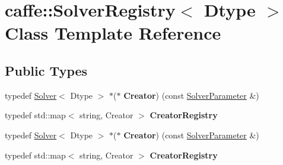 \hypertarget{classcaffe_1_1_solver_registry}{}\section{caffe\+:\+:Solver\+Registry$<$ Dtype $>$ Class Template Reference}
\label{classcaffe_1_1_solver_registry}
\subsection*{Public Types}
\begin{DoxyCompactItemize}
\item 
\mbox{\label{classcaffe_1_1_solver_registry_a27f13add21a1278d9a41b97b1c03ce1b}} 
typedef \mbox{\hyperlink{classcaffe_1_1_solver}{Solver}}$<$ Dtype $>$ $\ast$($\ast$ {\bfseries Creator}) (const \mbox{\hyperlink{classcaffe_1_1_solver_parameter}{Solver\+Parameter}} \&)
\item 
\mbox{\label{classcaffe_1_1_solver_registry_acbb92bec38689921e8c76feb85114733}} 
typedef std\+::map$<$ string, Creator $>$ {\bfseries Creator\+Registry}
\item 
\mbox{\label{classcaffe_1_1_solver_registry_a27f13add21a1278d9a41b97b1c03ce1b}} 
typedef \mbox{\hyperlink{classcaffe_1_1_solver}{Solver}}$<$ Dtype $>$ $\ast$($\ast$ {\bfseries Creator}) (const \mbox{\hyperlink{classcaffe_1_1_solver_parameter}{Solver\+Parameter}} \&)
\item 
\mbox{\label{classcaffe_1_1_solver_registry_acbb92bec38689921e8c76feb85114733}} 
typedef std\+::map$<$ string, Creator $>$ {\bfseries Creator\+Registry}
\end{DoxyCompactItemize}

